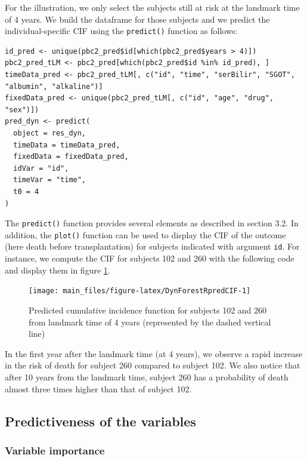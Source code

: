 For the illustration, we only select the subjects still at risk at the landmark time of 4 years. We build the dataframe for those subjects and we predict the individual-specific CIF using the \texttt{predict()} function as follows:

\begin{verbatim}
id_pred <- unique(pbc2_pred$id[which(pbc2_pred$years > 4)])
pbc2_pred_tLM <- pbc2_pred[which(pbc2_pred$id %in% id_pred), ]
timeData_pred <- pbc2_pred_tLM[, c("id", "time", "serBilir", "SGOT", "albumin", "alkaline")]
fixedData_pred <- unique(pbc2_pred_tLM[, c("id", "age", "drug", "sex")])
pred_dyn <- predict(
  object = res_dyn,
  timeData = timeData_pred,
  fixedData = fixedData_pred,
  idVar = "id",
  timeVar = "time",
  t0 = 4
)
\end{verbatim}

The \texttt{predict()} function provides several elements as described in section 3.2. In addition, the \texttt{plot()} function can be used to display the CIF of the outcome (here death before transplantation) for subjects indicated with argument \texttt{id}. For instance, we compute the CIF for subjects 102 and 260 with the following code and display them in figure \ref{fig:DynForestRpredCIF}.

\begin{figure}

{\centering \texttt{[image: main\_files/figure-latex/DynForestRpredCIF-1]}

}

\caption{Predicted cumulative incidence function for subjects 102 and 260 from landmark time of 4 years (represented by the dashed vertical line)}\label{fig:DynForestRpredCIF}
\end{figure}

In the first year after the landmark time (at 4 years), we observe a rapid increase in the risk of death for subject 260 compared to subject 102. We also notice that after 10 years from the landmark time, subject 260 has a probability of death almost three times higher than that of subject 102.

\subsection{Predictiveness of the variables}\label{predictiveness-of-the-variables}

\subsubsection{Variable importance}\label{variable-importance-1}

